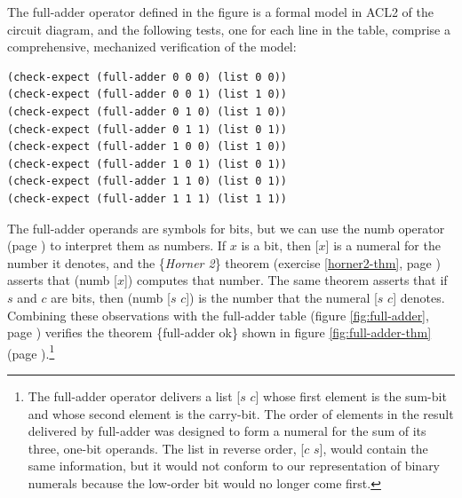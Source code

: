 The \textsf{full-adder} operator defined in the figure
is a formal model in ACL2 of the circuit diagram,
and the following tests, one for each line in the table,
comprise a comprehensive, mechanized verification of
the model:

\label{full-adder-model-check}
\begin{code}
\begin{verbatim}
(check-expect (full-adder 0 0 0) (list 0 0))
(check-expect (full-adder 0 0 1) (list 1 0))
(check-expect (full-adder 0 1 0) (list 1 0))
(check-expect (full-adder 0 1 1) (list 0 1))
(check-expect (full-adder 1 0 0) (list 1 0))
(check-expect (full-adder 1 0 1) (list 0 1))
(check-expect (full-adder 1 1 0) (list 0 1))
(check-expect (full-adder 1 1 1) (list 1 1))
\end{verbatim}
\end{code}

The \textsf{full-adder} operands
are symbols for bits, but we can use the \textsf{numb} operator
(page \pageref{nmb-defun})
to interpret them as numbers.
If $x$ is a bit, then \textsf{[$x$]} is a numeral for
the number it denotes, and the \{\emph{Horner 2}\} theorem
(exercise \ref{horner2-thm}, page \pageref{horner2-thm})
asserts that \textsf{(numb [$x$])} computes that number.
The same theorem asserts that if $s$ and $c$ are bits,
then \textsf{(numb [$s$ $c$])} is
the number that the numeral \textsf{[$s$ $c$]} denotes.
Combining these observations with the full-adder table
(figure \ref{fig:full-adder}, page \pageref{fig:full-adder})
verifies the theorem \{full-adder ok\} shown in
figure \ref{fig:full-adder-thm} (page \pageref{fig:full-adder-thm}).\footnote{The
\textsf{full-adder} operator delivers a list \textsf{[$s$ $c$]} whose first
element is the sum-bit and whose second element is the carry-bit.
The order of elements in the result delivered by \textsf{full-adder} was designed
to form a numeral for the sum of its three, one-bit operands.
The list in reverse order, \textsf{[$c$ $s$]},
would contain the same information,
but it would not conform to our representation of binary numerals
because the low-order bit would no longer come first.}

